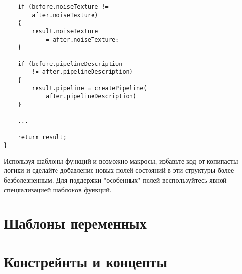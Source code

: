 \begin{itemize}
\begin{verbatim}
    if (before.noiseTexture !=
        after.noiseTexture)
    {
        result.noiseTexture
            = after.noiseTexture;
    }

    if (before.pipelineDescription
        != after.pipelineDescription)
    {
        result.pipeline = createPipeline(
            after.pipelineDescription)
    }

    ...

    return result;
}
\end{verbatim}
Используя шаблоны функций и возможно макросы, избавьте код от копипасты логики и сделайте добавление новых полей-состояний в эти структуры более безболезненным. Для поддержки "особенных" полей воспользуйтесь явной специализацией шаблонов функций. 
\end{itemize}

\section{Шаблоны переменных}


\section{Констрейнты и концепты}



